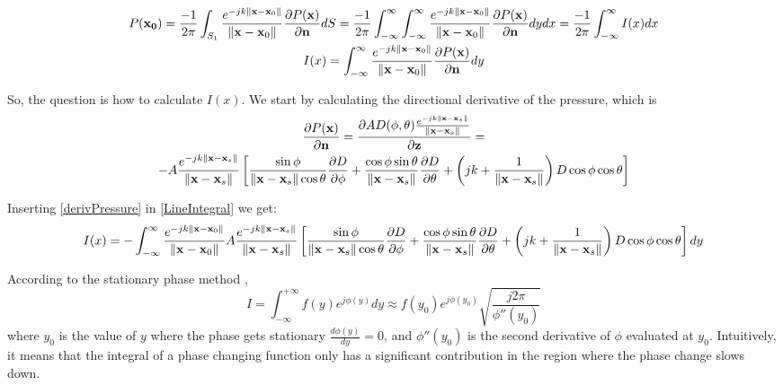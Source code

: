 \begin{gather}
P(\mathbf{x_0}) = \frac{-1}{2\pi} \int_{S_1} \frac{e^{-jk\left\| \mathbf{x} - \mathbf{x}_0 \right\|}}{\left\| \mathbf{x} - \mathbf{x}_0 \right\|} \frac{\partial P(\mathbf{x})}{\partial \mathbf{n}} dS = \frac{-1}{2\pi} \int_{-\infty}^{\infty} \int_{-\infty}^{\infty} \frac{e^{-jk\left\| \mathbf{x} - \mathbf{x}_0 \right\|}}{\left\| \mathbf{x} - \mathbf{x}_0 \right\|} \frac{\partial P(\mathbf{x})}{\partial \mathbf{n}} dy dx = \frac{-1}{2\pi} \int_{-\infty}^{\infty} I(x) dx \\
I(x) = \int_{-\infty}^{\infty} \frac{e^{-jk\left\| \mathbf{x} - \mathbf{x}_0 \right\|}}{\left\| \mathbf{x} - \mathbf{x}_0 \right\|} \frac{\partial P(\mathbf{x})}{\partial \mathbf{n}} dy
\label{LineIntegral}
\end{gather}

So, the question is how to calculate $I(x)$. We start by calculating the directional derivative of the pressure, which is \cite{Verheijen}
\begin{multline}
\frac{\partial P(\vec{x})}{\partial \mathbf{n}} = \frac{\partial \coef \Diag(\phi, \theta) \GreenFunc[\vec{x} - \vec{x}_s]}{\partial \mathbf{z}} = \\ -A \GreenFunc[\vec{x} - \vec{x}_s] \left[ \frac{\sin\phi}{\norm{\vec{x} - \vec{x}_s}\cos\theta}\frac{\partial\Diag}{\partial\phi} + \frac{\cos\phi \sin\theta}{\norm{\vec{x} - \vec{x}_s}} \frac{\partial\Diag}{\partial\theta} + \left(jk + \frac{1}{\norm{\vec{x} - \vec{x}_s}}\right) \Diag \cos\phi \cos\theta \right]
\label{derivPressure}
\end{multline}

Inserting \autoref{derivPressure} in \autoref{LineIntegral} we get:
\begin{equation}
I(x) = -\int_{-\infty}^{\infty} \GreenFunc[\vec{x} - \vec{x}_0] A \GreenFunc[\vec{x} - \vec{x}_s] \left[ \frac{\sin\phi}{\norm{\vec{x} - \vec{x}_s}\cos\theta}\frac{\partial\Diag}{\partial\phi} + \frac{\cos\phi \sin\theta}{\norm{\vec{x} - \vec{x}_s}} \frac{\partial\Diag}{\partial\theta} + \left(jk + \frac{1}{\norm{\vec{x} - \vec{x}_s}}\right) \Diag \cos\phi \cos\theta \right] dy
\label{integrateY}
\end{equation}

According to the stationary phase method \cite{Verheijen},
\begin{equation}
I = \int_{-\infty}^{+\infty} f(y) e^{j\phi(y)} dy \approx f(y_0) e^{j\phi(y_0)} \sqrt{\frac{j 2\pi}{\phi''(y_0)}}
\end{equation}
where $y_0$ is the value of $y$ where the phase gets stationary $\frac{d\phi(y)}{dy} = 0$, and $\phi''(y_0)$ is the second derivative of $\phi$ evaluated at $y_0$. Intuitively, it means that the integral of a phase changing function only has a significant contribution in the region where the phase change slows down.


